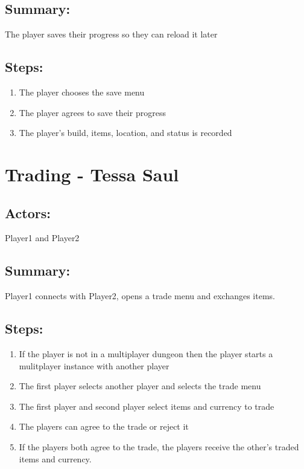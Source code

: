 \documentclass[11pt]{article}
\begin{document}
      \subsection{Summary:} The player saves their progress so they can reload it later
      
      \subsection{Steps:} 
      \begin{enumerate}
      \item The player chooses the save menu
      \item The player agrees to save their progress
      \item The player's build, items, location, and status is recorded
      \end{enumerate}
      
    \section{Trading - Tessa Saul}
      
      \subsection{Actors:} Player1 and Player2
      
      \subsection{Summary:} Player1 connects with Player2, opens a trade menu and exchanges items. 
      
      \subsection{Steps:}
      \begin{enumerate}
      \item If the player is not in a multiplayer dungeon then the player starts a mulitplayer instance with another player
      \item The first player selects another player and selects the trade menu
      \item The first player and second player select items and currency to trade
      \item The players can agree to the trade or reject it
      \item If the players both agree to the trade, the players receive the other's traded items and currency.
      \end{enumerate}
\end{document}
